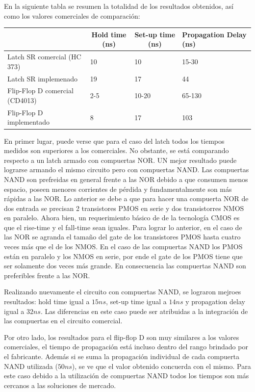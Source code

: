 En la siguiente tabla se resumen la totalidad de los resultados obtenidos, as\'i como los valores comerciales de comparaci\'on:

\begin{table}[H]
\centering
\begin{tabular}{llll}\hline
\multicolumn{1}{c}{}           & \multicolumn{1}{c}{Hold time (ns)} & \multicolumn{1}{c}{Set-up time (ns)} & Propagation Delay (ns) \\
\hline
Latch SR comercial (HC 373)    & 10                                 & 10                                   & 15-30                  \\
Latch SR implemenado           & 19                              &   17                                   &  44                \\
Flip-Flop D comercial (CD4013) & 2-5                                & 10-20                                & 65-130                 \\
Flip-Flop D implementado       & 8    &         17                             &             103           \\  \hline
\end{tabular}
\end{table}


En primer lugar, puede verse que para el caso del latch todos los tiempos medidos son superiores a los comerciales. No obstante, se está comparando respecto a un latch armado con compuertas NOR. UN mejor resultado puede lograrse armando el mismo circuito pero con compuertas NAND. Las compuertas NAND son prefreidas en general frente a las NOR debido a que consumen menos espacio, poseen menores corrientes de pérdida y fundamentalmente son más rápidas a las NOR. Lo anterior se debe a que para hacer una compuerta NOR de dos entrada se precisan 2 transistores PMOS en serie y dos transistorres NMOS en paralelo. Ahora bien, un requerimiento básico de de la tecnología CMOS es que el rise-time y el fall-time sean iguales. Para lograr lo anterior, en el caso de las NOR se agranda el tamaño del gate de los transistores PMOS hasta cuatro veces más que el de los NMOS. En el caso de las compuertas NAND los PMOS están en paralelo y los NMOS en serie, por ende el gate de los PMOS tiene que ser solamente dos veces más grande. En consecuencia las compuertas NAND son preferibles frente a las NOR. 



Realizando nuevamente el circuito con compuertas NAND, se lograron mejroes resultados: hold time igual a $15ns$, set-up time igual a $14ns$ y propagation delay igual a $32ns$. Las diferencias en este caso puede ser atribuidas a la integración de las compuertas en el circuito comercial. 



Por otro lado, los resultados para el flip-flop D son muy similares a los valores comerciales, el tiempo de propagación está incluso dentro del rango brindado por el fabricante. Además si se suma la propagación individual de cada compuerta NAND utilizada ($50ns$), se ve que el valor obtenido concuerda con el mismo. Para este caso debido a la utilización de compuertas NAND todos los tiempos son más cercanos a las soluciones de mercado. 